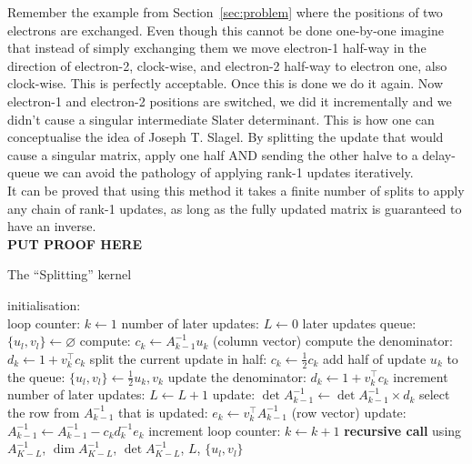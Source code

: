 \documentclass[11pt]{article}
\numberwithin{figure}{section}
\numberwithin{table}{section}
\begin{document}
				Remember the example from Section~\ref{sec:problem} where the positions of two electrons are exchanged. Even though this cannot be done one-by-one imagine that instead of simply exchanging them we move electron-1 half-way in the direction of electron-2, clock-wise, and electron-2 half-way to electron one, also clock-wise. This is perfectly acceptable. Once this is done we do it again. Now electron-1 and electron-2 positions are switched, we did it incrementally and we didn't cause a singular intermediate Slater determinant. This is how one can conceptualise the idea of Joseph T. Slagel. By splitting the update that would cause a singular matrix, apply one half AND sending the other halve to a delay-queue we can avoid the pathology of applying rank-1 updates iteratively.\\
				
				It can be proved that using this method it takes a finite number of splits to apply any chain of rank-1 updates, as long as the fully updated matrix is guaranteed to have an inverse.\\
				
				\textbf{PUT PROOF HERE}\\
				
				\begin{algorithm}[H]
				\caption{The ``Splitting'' kernel}\label{algo:splitting}
				initialisation:\\
				loop counter: $k \gets 1$\;
				number of later updates: $L \gets 0$\;
				later updates queue: $\{u_l, v_l\} \gets \varnothing$\;
				{
					compute: $c_k \gets A^{-1}_{k-1}u_k$ (column vector)\;
					compute the denominator: $d_k \gets 1 + v_k^\top c_k$\;
					{
						split the current update in half: $c_k\gets \frac{1}{2}c_k$\;
						add half of update $u_k$ to the queue: $\{u_l,v_l\} \gets \frac{1}{2}u_k, v_k$\;
						update the denominator: $d_k\gets 1 + v_k^\top c_k$\;
						increment number of later updates: $L \gets L + 1$\;
					}
					update: $\det A^{-1}_{k-1} \gets \det A^{-1}_{k-1}\times d_k$\;
					select the row from $A^{-1}_{k-1}$ that is updated: $e_k \gets v_k^\top A^{-1}_{k-1}$ (row vector)\;
					update: $A^{-1}_{k-1} \gets A^{-1}_{k-1} - c_kd_k^{-1}e_k$\;
					increment loop counter: $k \gets k + 1$\;
				}
				{
					\textbf{recursive call} using $A^{-1}_{K-L}$, $\dim A^{-1}_{K-L}$, $\det A^{-1}_{K-L} $, $L$, $\{u_l, v_l\}$\;
				}
				\end{algorithm}
			
\end{document}
